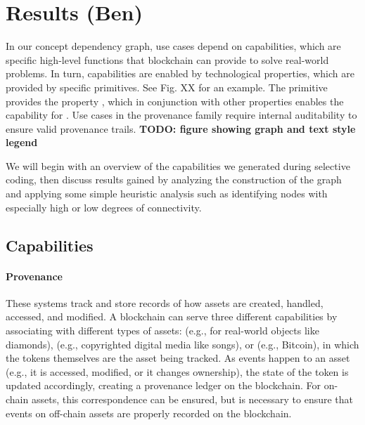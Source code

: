 
\section{Results (Ben)}
In our concept dependency graph, use cases depend on capabilities, which are specific high-level functions that blockchain can provide to solve real-world problems. In turn, capabilities are enabled by technological properties, which are provided by specific primitives. See Fig. XX for an example.  The primitive  provides the property , which in conjunction with other properties enables the capability for . Use cases in the provenance family require internal auditability to ensure valid provenance trails.
\textbf{TODO: figure showing graph and text style legend}

We will begin with an overview of the capabilities we generated during selective coding, then discuss results gained by analyzing the construction of the graph and applying some simple heuristic analysis such as identifying nodes with especially high or low degrees of connectivity.

\subsection{Capabilities}
\paragraph{Provenance} These systems track and store records of how assets are created, handled, accessed, and modified. A blockchain can serve three different capabilities by associating  with different types of assets:  (e.g., for real-world objects like diamonds),  (e.g., copyrighted digital media like songs), or  (e.g., Bitcoin), in which the tokens themselves are the asset being tracked. As events happen to an asset (e.g., it is accessed, modified, or it changes ownership), the state of the token is updated accordingly, creating a provenance ledger on the blockchain. For on-chain assets, this correspondence can be ensured, but  is necessary to ensure that events on off-chain assets are properly recorded on the blockchain.

